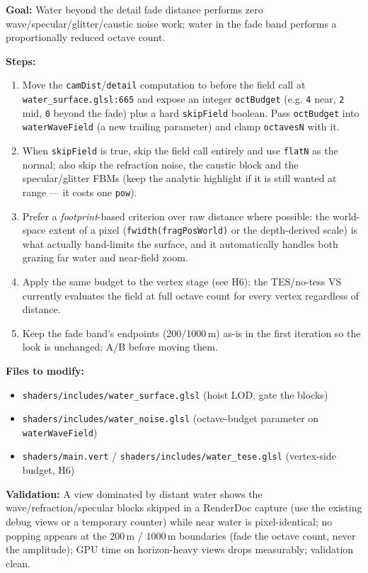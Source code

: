 \documentclass[11pt,a4paper]{article}
\begin{document}
\begin{tcolorbox}[promptbox={Prompt: Evaluate at the LOD the Pixel Can Actually Resolve}]
\textbf{Goal:} Water beyond the detail fade distance performs zero wave/specular/glitter/caustic noise work; water in the
fade band performs a proportionally reduced octave count.

\textbf{Steps:}
\begin{enumerate}
    \item Move the \texttt{camDist}/\texttt{detail} computation to before the field call at
    \texttt{water\_surface.glsl:665} and expose an integer \texttt{octBudget} (e.g. \texttt{4} near, \texttt{2} mid,
    \texttt{0} beyond the fade) plus a hard \texttt{skipField} boolean. Pass \texttt{octBudget} into
    \texttt{waterWaveField} (a new trailing parameter) and clamp \texttt{octavesN} with it.
    \item When \texttt{skipField} is true, skip the field call entirely and use \texttt{flatN} as the normal; also skip
    the refraction noise, the caustic block and the specular/glitter FBMs (keep the analytic highlight if it is still
    wanted at range --- it costs one \texttt{pow}).
    \item Prefer a \emph{footprint}-based criterion over raw distance where possible: the world-space extent of a pixel
    (\texttt{fwidth(fragPosWorld)} or the depth-derived scale) is what actually band-limits the surface, and it
    automatically handles both grazing far water and near-field zoom.
    \item Apply the same budget to the vertex stage (see H6): the TES/no-tess VS currently evaluates the field at full
    octave count for every vertex regardless of distance.
    \item Keep the fade band's endpoints (200/1000\,m) as-is in the first iteration so the look is unchanged; A/B before
    moving them.
\end{enumerate}

\textbf{Files to modify:}
\begin{itemize}
    \item \texttt{shaders/includes/water\_surface.glsl} (hoist LOD, gate the blocks)
    \item \texttt{shaders/includes/water\_noise.glsl} (octave-budget parameter on \texttt{waterWaveField})
    \item \texttt{shaders/main.vert} / \texttt{shaders/includes/water\_tese.glsl} (vertex-side budget, H6)
\end{itemize}

\textbf{Validation:} A view dominated by distant water shows the wave/refraction/specular blocks skipped in a RenderDoc
capture (use the existing debug views or a temporary counter) while near water is pixel-identical; no popping appears at
the 200\,m / 1000\,m boundaries (fade the octave count, never the amplitude); GPU time on horizon-heavy views drops
measurably; validation clean.
\end{tcolorbox}
\end{document}
